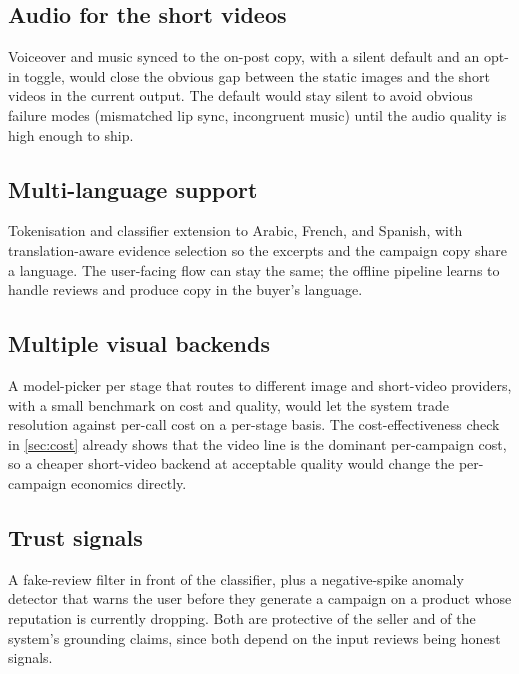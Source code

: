 \documentclass[12pt,a4paper]{report}
\begin{document}
\subsection{Audio for the short videos}

Voiceover and music synced to the on-post copy, with a silent default and an opt-in toggle, would close the obvious gap between the static images and the short videos in the current output. The default would stay silent to avoid obvious failure modes (mismatched lip sync, incongruent music) until the audio quality is high enough to ship.

\subsection{Multi-language support}

Tokenisation and classifier extension to Arabic, French, and Spanish, with translation-aware evidence selection so the excerpts and the campaign copy share a language. The user-facing flow can stay the same; the offline pipeline learns to handle reviews and produce copy in the buyer's language.

\subsection{Multiple visual backends}

A model-picker per stage that routes to different image and short-video providers, with a small benchmark on cost and quality, would let the system trade resolution against per-call cost on a per-stage basis. The cost-effectiveness check in \cref{sec:cost} already shows that the video line is the dominant per-campaign cost, so a cheaper short-video backend at acceptable quality would change the per-campaign economics directly.

\subsection{Trust signals}

A fake-review filter in front of the classifier, plus a negative-spike anomaly detector that warns the user before they generate a campaign on a product whose reputation is currently dropping. Both are protective of the seller and of the system's grounding claims, since both depend on the input reviews being honest signals.




\end{document}
